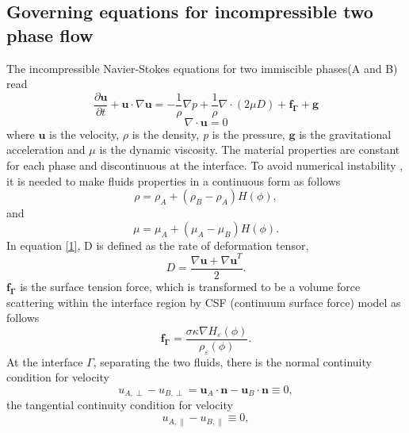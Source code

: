 \subsection{Governing equations for incompressible two phase flow}
The incompressible Navier-Stokes equations for two immiscible phases(A and B) read
\begin{equation}\label{1}
\frac{\partial \mathbf{u}}{\partial t}
+ \mathbf{u}\cdot\nabla\mathbf{u}
=
-\frac{1}{\rho}\nabla{p}
+\frac{1}{\rho}\nabla\cdot(2\mu{D})
+\mathbf{f_\Gamma}
+\mathbf{g}
\end{equation}
\begin{equation}\label{2}
\nabla\cdot\mathbf{u}=0
\end{equation}
where $\mathbf{u}$ is the velocity, $\rho$ is the density, \textit{p} is the pressure, $\mathbf{g}$ is the gravitational acceleration and $\mu$ is the dynamic viscosity. The material properties are constant for each phase and discontinuous at the interface. To avoid numerical instability \cite{son2002coupled}, it is needed to make fluids properties in a continuous form as follows
\begin{equation}\label{16}
\rho=\rho_A + (\rho_B-\rho_A)H(\phi),
\end{equation}
and
\begin{equation}\label{17}
\mu=\mu_A + (\mu_A-\mu_B)H(\phi).
\end{equation}
In equation \ref{1}, D is defined as the rate of deformation tensor,
\begin{equation}\label{3}
D=\frac{\nabla\mathbf{u}+{\nabla\mathbf{u}}^T}{2}.
\end{equation}
$\mathbf{f_\Gamma}$ is the surface tension force, which is transformed to be a volume force scattering within the interface region by CSF (continuum surface force) model\cite{brackbill1992continuum} as follows
\begin{equation}\label{4}
\mathbf{f_\Gamma}
=
\frac{\sigma\kappa\nabla{H_\varepsilon(\phi)}}{\rho_\varepsilon(\phi)}.
\end{equation}
At the interface $\Gamma$, separating the two fluids, there is the normal continuity condition for velocity
\begin{equation}\label{5}
u_{A,\perp}-u_{B,\perp}
=
\mathbf{u}_A\cdot\mathbf{n}
-
\mathbf{u}_B\cdot\mathbf{n}
\equiv
0,
\end{equation}
the tangential continuity condition for velocity
\begin{equation}\label{6}
u_{A,\parallel}-u_{B,\parallel}
\equiv
0,
\end{equation}
